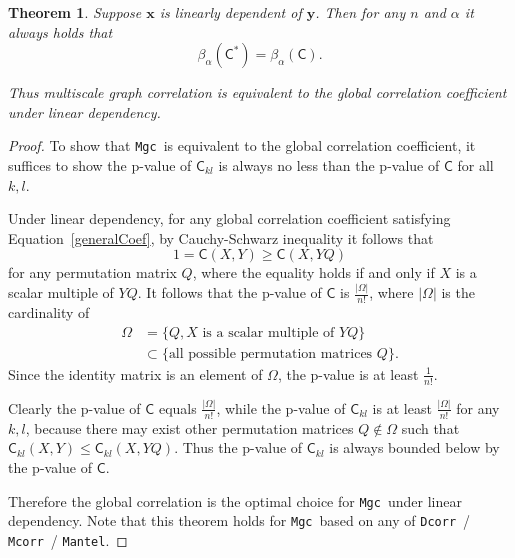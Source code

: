 \documentclass[11pt]{article}
\providecommand{\sct}[1]{{\sc \texttt{#1}}}
\providecommand{\mb}[1]{\boldsymbol{#1}}
\newcommand{\G}{\mathsf{C}}
\newcommand{\Mgc}{\sct{Mgc}}
\newcommand{\Dcorr}{\sct{Dcorr}}
\newcommand{\Mcorr}{\sct{Mcorr}}
\newcommand{\Mantel}{\sct{Mantel}}
\newtheorem{appThm}{Theorem}
\begin{document}
\begin{appThm}
Suppose $\mb{x}$ is linearly dependent of $\mb{y}$. Then for any $n$ and $\alpha$ it always holds that
\begin{equation}
\beta_{\alpha}(\G^{*}) = \beta_{\alpha}(\G).
\end{equation}

Thus multiscale graph correlation is equivalent to the global correlation coefficient under linear dependency.
\end{appThm}
\begin{proof}
To show that \Mgc~is equivalent to the global correlation coefficient, it suffices to show the p-value of $\G_{kl}$ is always no less than the p-value of $\G$ for all $k,l$.

Under linear dependency, for any global correlation coefficient satisfying Equation~\ref{generalCoef}, by Cauchy-Schwarz inequality it follows that
\begin{equation}
1=\G(X, Y) \geq \G(X, YQ)
\end{equation}
for any permutation matrix $Q$, where the equality holds if and only if $X$ is a scalar multiple of $YQ$. It follows that the p-value of $\G$ is $\frac{|\Omega|}{n!}$, where $|\Omega|$ is the cardinality of 
\begin{align*}
\Omega &=\{Q, X \mbox{ is a scalar multiple of }YQ\} \\
&\subset \{\mbox{all possible permutation matrices }Q\}. 
\end{align*}
Since the identity matrix is an element of $\Omega$, the p-value is at least $\frac{1}{n!}$.

Clearly the p-value of $\G$ equals $\frac{|\Omega|}{n!}$, while the p-value of $\G_{kl}$ is at least $\frac{|\Omega|}{n!}$ for any $k,l$, because there may exist other permutation matrices $Q \notin \Omega$ such that $\G_{kl}(X,Y) \leq \G_{kl}(X,YQ)$. Thus the p-value of $\G_{kl}$ is always bounded below by the p-value of $\G$.

Therefore the global correlation is the optimal choice for \Mgc~under linear dependency. Note that this theorem holds for \Mgc~based on any of \Dcorr~/ \Mcorr~/ \Mantel.
\end{proof}
\end{document}
